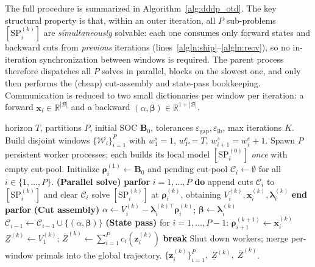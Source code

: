 The full procedure is summarized in Algorithm~\ref{alg:dddp_otd}. The
key structural property is that, within an outer iteration, all $P$
sub-problems $[\mathrm{SP}_i^{(k)}]$ are \emph{simultaneously} solvable:
each one consumes only forward states and backward cuts from
\emph{previous} iterations (lines~\ref{algln:ship}--\ref{algln:recv}),
so no in-iteration synchronization between windows is required. The
parent process therefore dispatches all $P$ solves in parallel, blocks
on the slowest one, and only then performs the (cheap) cut-assembly
and state-pass bookkeeping. Communication is reduced to two small
dictionaries per window per iteration: a forward
$\bm{x}_i\!\in\!\mathbb{R}^{|\mathcal{B}|}$ and a backward
$(\alpha,\bm{\beta})\!\in\!\mathbb{R}^{1+|\mathcal{B}|}$.

\begin{algorithm}[t]
\caption{Parallel multi-cut DDDP--OTD}
\label{alg:dddp_otd}
\begin{algorithmic}[1]
\Require horizon $T$, partitions $P$, initial SOC $\bm{B}_0$,
         tolerances $\varepsilon_{\text{gap}},\varepsilon_{\text{lb}}$,
         max iterations $K$.
\State Build disjoint windows $\{\mathcal{W}_i\}_{i=1}^{P}$ with
       $w^{s}_1{=}1$, $w^{e}_P{=}T$, $w^{s}_{i+1}{=}w^{e}_i{+}1$.
\State Spawn $P$ persistent worker processes; each builds its local
       model $[\mathrm{SP}_i^{(0)}]$ \emph{once} with empty cut-pool.
\State Initialize $\bm{\rho}_i^{(1)} \leftarrow \bm{B}_0$ and
       pending cut-pool $\mathcal{C}_i \leftarrow \emptyset$
       for all $i\!\in\!\{1,\dots,P\}$.
   \State \textbf{(Parallel solve)}\;
          \textbf{parfor} $i = 1, \dots, P$ \textbf{do}
                          \label{algln:par_begin}
   \State \quad append cuts $\mathcal{C}_i$ to $[\mathrm{SP}_i^{(k)}]$
          and clear $\mathcal{C}_i$
                          \label{algln:recv}
   \State \quad solve $[\mathrm{SP}_i^{(k)}]$ at $\bm{\rho}_i^{(k)}$,
          obtaining $V_i^{(k)},\bm{x}_i^{(k)},\bm{\lambda}_i^{(k)}$
   \State \textbf{end parfor}
                          \label{algln:par_end}
   \State \textbf{(Cut assembly)} 
       \State $\alpha \leftarrow V_i^{(k)} -
              \bm{\lambda}_i^{(k)\top}\bm{\rho}_i^{(k)}$;\;\;
              $\bm{\beta} \leftarrow \bm{\lambda}_i^{(k)}$
       \State $\mathcal{C}_{i-1} \leftarrow \mathcal{C}_{i-1}\cup\{(\alpha,\bm{\beta})\}$
                          \label{algln:cut_emit}
   \EndFor
   \State \textbf{(State pass)} for $i=1,\dots,P{-}1$:
          $\bm{\rho}_{i+1}^{(k+1)} \leftarrow \bm{x}_i^{(k)}$
                          \label{algln:ship}
   \State $\underline{Z}^{(k)} \leftarrow V_1^{(k)}$;\;\;
          $\overline{Z}^{(k)} \leftarrow \sum_{i=1}^{P} c_i(\bm{z}_i^{(k)})$
       \State \textbf{break}
   \EndIf
\EndFor
\State Shut down workers; merge per-window primals into the global trajectory.
\State \Return $\{\bm{z}_i^{(k)}\}_{i=1}^P,\;
                \underline{Z}^{(k)},\;\overline{Z}^{(k)}$.
\end{algorithmic}
\end{algorithm}


